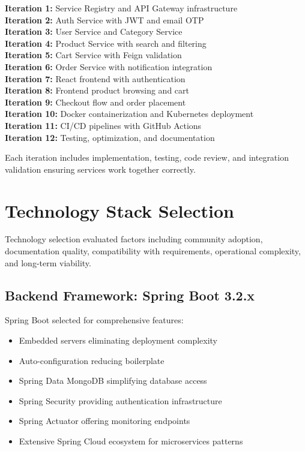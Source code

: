 \textbf{Iteration 1:} Service Registry and API Gateway infrastructure\\
\textbf{Iteration 2:} Auth Service with JWT and email OTP\\
\textbf{Iteration 3:} User Service and Category Service\\
\textbf{Iteration 4:} Product Service with search and filtering\\
\textbf{Iteration 5:} Cart Service with Feign validation\\
\textbf{Iteration 6:} Order Service with notification integration\\
\textbf{Iteration 7:} React frontend with authentication\\
\textbf{Iteration 8:} Frontend product browsing and cart\\
\textbf{Iteration 9:} Checkout flow and order placement\\
\textbf{Iteration 10:} Docker containerization and Kubernetes deployment\\
\textbf{Iteration 11:} CI/CD pipelines with GitHub Actions\\
\textbf{Iteration 12:} Testing, optimization, and documentation

Each iteration includes implementation, testing, code review, and integration validation ensuring services work together correctly.

\section{Technology Stack Selection}

Technology selection evaluated factors including community adoption, documentation quality, compatibility with requirements, operational complexity, and long-term viability.

\subsection{Backend Framework: Spring Boot 3.2.x}

Spring Boot selected for comprehensive features:
\begin{itemize}
    \item Embedded servers eliminating deployment complexity
    \item Auto-configuration reducing boilerplate
    \item Spring Data MongoDB simplifying database access
    \item Spring Security providing authentication infrastructure
    \item Spring Actuator offering monitoring endpoints
    \item Extensive Spring Cloud ecosystem for microservices patterns
\end{itemize}

